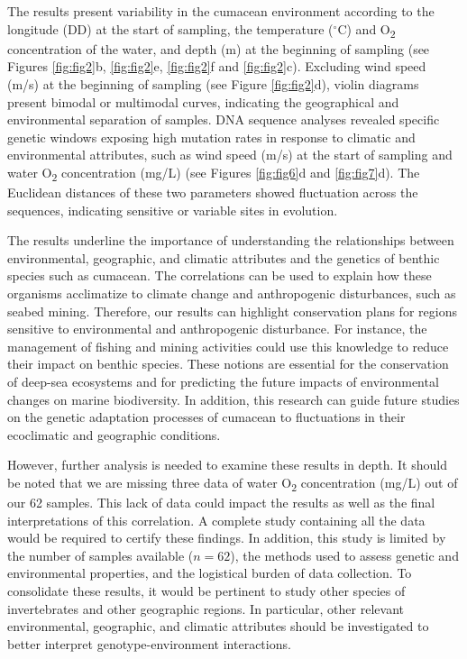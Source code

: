 The results present variability in the cumacean environment according to the longitude (DD) at the start of sampling, the temperature ($^\circ$C) and  O\textsubscript{2} concentration of the water, and depth (m) at the beginning of sampling (see Figures \ref{fig:fig2}b, \ref{fig:fig2}e, \ref{fig:fig2}f and \ref{fig:fig2}c). Excluding wind speed (m/s) at the beginning of sampling (see Figure \ref{fig:fig2}d), violin diagrams present bimodal or multimodal curves, indicating the geographical and environmental separation of samples. DNA sequence analyses revealed specific genetic windows exposing high mutation rates in response to climatic and environmental attributes, such as wind speed (m/s) at the start of sampling and water O\textsubscript{2} concentration (mg/L) (see Figures \ref{fig:fig6}d and \ref{fig:fig7}d). The Euclidean distances of these two parameters showed fluctuation across the sequences, indicating sensitive or variable sites in evolution.

The results underline the importance of understanding the relationships between environmental, geographic, and climatic attributes and the genetics of benthic species such as cumacean. The correlations can be used to explain how these organisms acclimatize to climate change and anthropogenic disturbances, such as seabed mining. Therefore, our results can highlight conservation plans for regions sensitive to environmental and anthropogenic disturbance. For instance, the management of fishing and mining activities could use this knowledge to reduce their impact on benthic species. These notions are essential for the conservation of deep-sea ecosystems and for predicting the future impacts of environmental changes on marine biodiversity. In addition, this research can guide future studies on the genetic adaptation processes of cumacean to fluctuations in their ecoclimatic and geographic conditions.

However, further analysis is needed to examine these results in depth. It should be noted that we are missing three data of water O\textsubscript{2} concentration (mg/L) out of our 62 samples. This lack of data could impact the results as well as the final interpretations of this correlation. A complete study containing all the data would be required to certify these findings. In addition, this study is limited by the number of samples available ($n=62$), the methods used to assess genetic and environmental properties, and the logistical burden of data collection. To consolidate these results, it would be pertinent to study other species of invertebrates and other geographic regions. In particular, other relevant environmental, geographic, and climatic attributes should be investigated to better interpret genotype-environment interactions.


